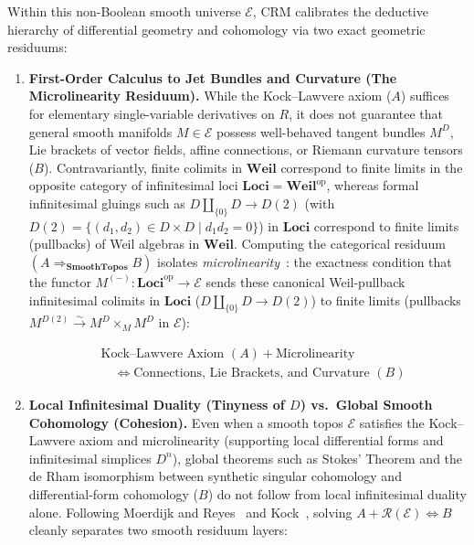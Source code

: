 Within this non-Boolean smooth universe $\mathcal{E}$, $\mathrm{CRM}$ calibrates the deductive hierarchy of differential geometry and cohomology via two exact geometric residuums:

\begin{enumerate}

  \item \textbf{First-Order Calculus to Jet Bundles and Curvature (The Microlinearity Residuum).} While the Kock--Lawvere axiom ($A$) suffices for elementary single-variable derivatives on $R$, it does not guarantee that general smooth manifolds $M \in \mathcal{E}$ possess well-behaved tangent bundles $M^D$, Lie brackets of vector fields, affine connections, or Riemann curvature tensors ($B$). Contravariantly, finite colimits in $\mathbf{Weil}$ correspond to finite limits in the opposite category of infinitesimal loci $\mathbf{Loci} = \mathbf{Weil}^{\mathrm{op}}$, whereas formal infinitesimal gluings such as $D \amalg_{\{0\}} D \to D(2)$ (with $D(2) = \{(d_1, d_2) \in D \times D \mid d_1 d_2 = 0\}$) in $\mathbf{Loci}$ correspond to finite limits (pullbacks) of Weil algebras in $\mathbf{Weil}$. Computing the categorical residuum $(A \Rightarrow_{\mathbf{SmoothTopos}} B)$ isolates \emph{microlinearity}~\cite{Kock06,MoerdijkReyes91}: the exactness condition that the functor $M^{(-)} : \mathbf{Loci}^{\mathrm{op}} \to \mathcal{E}$ sends these canonical Weil-pullback infinitesimal colimits in $\mathbf{Loci}$ ($D \amalg_{\{0\}} D \to D(2)$) to finite limits (pullbacks $M^{D(2)} \xrightarrow{\sim} M^D \times_M M^D$ in $\mathcal{E}$):

\[
  \begin{aligned}
    &\text{Kock--Lawvere Axiom } (A) + \text{Microlinearity} \\
    &\quad\Longleftrightarrow \text{Connections, Lie Brackets, and Curvature } (B)
  \end{aligned}
\]

  \item \textbf{Local Infinitesimal Duality (Tinyness of $D$) vs.\ Global Smooth Cohomology (Cohesion).} Even when a smooth topos $\mathcal{E}$ satisfies the Kock--Lawvere axiom and microlinearity (supporting local differential forms and infinitesimal simplices $D^n$), global theorems such as Stokes' Theorem and the de Rham isomorphism between synthetic singular cohomology and differential-form cohomology ($B$) do not follow from local infinitesimal duality alone. Following Moerdijk and Reyes~\cite[Ch.~III, Thm.~1.10 \& \S 2]{MoerdijkReyes91} and Kock~\cite{Kock06}, solving $A + \mathcal{R}(\mathcal{E}) \iff B$ cleanly separates two smooth residuum layers:


\end{enumerate}
